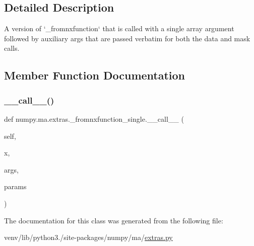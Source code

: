 \subsection{Detailed Description}
\begin{DoxyVerb}A version of `_fromnxfunction` that is called with a single array
argument followed by auxiliary args that are passed verbatim for
both the data and mask calls.
\end{DoxyVerb}
 

\subsection{Member Function Documentation}
\mbox{\label{classnumpy_1_1ma_1_1extras_1_1__fromnxfunction__single_a75f09b57fe50e6d7caf3d66bed2ce07d}} 
\subsubsection{\texorpdfstring{\+\_\+\+\_\+call\+\_\+\+\_\+()}{\_\_call\_\_()}}
{\footnotesize\ttfamily def numpy.\+ma.\+extras.\+\_\+fromnxfunction\+\_\+single.\+\_\+\+\_\+call\+\_\+\+\_\+ (\begin{DoxyParamCaption}\item[{}]{self,  }\item[{}]{x,  }\item[{}]{args,  }\item[{}]{params }\end{DoxyParamCaption})}



The documentation for this class was generated from the following file\+:\begin{DoxyCompactItemize}
\item 
venv/lib/python3./site-\/packages/numpy/ma/\hyperlink{extras_8py}{extras.\+py}\end{DoxyCompactItemize}
